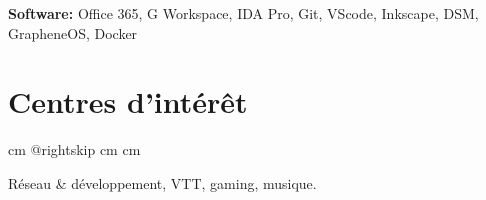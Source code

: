 \documentclass[10pt, fr-FR]{article}
\begin{document}
\textbf{Software:} Office 365, G Workspace, IDA Pro, Git, VScode, Inkscape, DSM, GrapheneOS, Docker \par\endgroup

\section{Centres d'intérêt}

\begingroup{} cm
\advance\csname @rightskip cm
\advance{} cm

Réseau \& développement, VTT, gaming, musique. \par\endgroup
\end{document}
